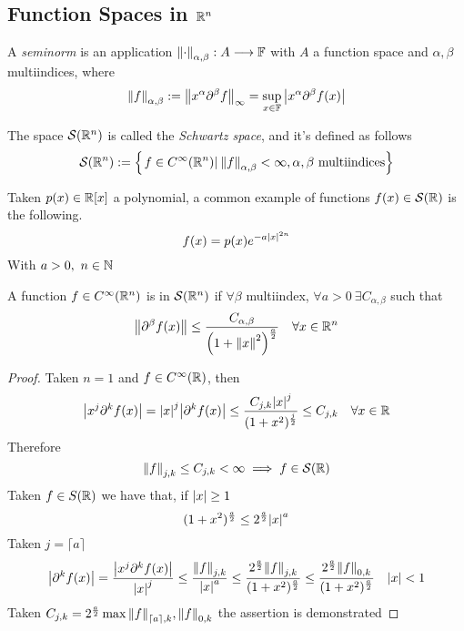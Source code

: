 \documentclass[../complete.tex]{subfiles}
\begin{document}
\subsection{Function Spaces in $\mathbb{R}^n$}
\begin{dfn}[Seminorm]
	A \textit{seminorm} is an application $\norm{\cdot}_{\alpha,\beta}:A\overset{}{\longrightarrow}\mathbb{F}$ with $A$ a function space and $\alpha,\beta$ multiindices, where
	\begin{equation}
		\norm{f}_{\alpha,\beta}:=\norm{x^\alpha\partial^\beta f}_\infty=\sup_{x\in\mathbb{F}}\abs{x^\alpha\partial^\beta f(x)}
		\label{eq:seminorm}
	\end{equation}
\end{dfn}
\begin{dfn}
	The space $\mathcal{S}(\mathbb{R}^n)$ is called the \textit{Schwartz space}, and it's defined as follows
	\begin{equation}
		\mathcal{S}(\mathbb{R}^n):=\left\{ \left.f\in C^\infty(\mathbb{R}^n)\right|_{}\norm{f}_{\alpha,\beta}<\infty, \alpha,\beta\text{ multiindices} \right\}
		\label{eq:schwartzspace}
	\end{equation}
\end{dfn}
\begin{eg}
	Taken $p(x)\in\mathbb{R}[x]$ a polynomial, a common example of functions $f(x)\in\mathcal{S}(\mathbb{R})$ is the following.
	\begin{equation}
		f(x)=p(x)e^{-a\abs{x}^{2n}}
		\label{eq:schwartzfunc}
	\end{equation}
	With $a>0,\ n\in\mathbb{N}$
\end{eg}
\begin{thm}
	A function $f\in C^\infty(\mathbb{R}^n)$ is in $\mathcal{S}(\mathbb{R}^n)$ if $\forall\beta$ multiindex, $\forall a>0\ \exists C_{\alpha,\beta}$ such that
	\begin{equation}
		\norm{\partial^\beta f(x)}\le\frac{C_{\alpha,\beta}}{\left( 1+\norm{x}^2 \right)^{\frac{a}{2}}}\quad\forall x\in\mathbb{R}^n
		\label{eq:schwartzfunc2}
	\end{equation}
\end{thm}
\begin{proof}
	Taken $n=1$ and $f\in C^\infty(\mathbb{R})$, then
	\begin{equation*}
		\abs{x^j\partial^kf(x)}=\abs{x}^j\abs{\partial^kf(x)}\le\frac{C_{j,k}\abs{x}^j}{(1+x^2)^{\frac{j}{2}}}\le C_{j,k}\quad\forall x\in\mathbb{R}
	\end{equation*}
	Therefore
	\begin{equation*}
		\norm{f}_{j,k}\le C_{j,k}<\infty\implies f\in\mathcal{S}(\mathbb{R})
	\end{equation*}
	Taken $f\in{S}(\mathbb{R})$ we have that, if $\abs{x}\ge1$
	\begin{equation*}
		(1+x^2)^{\frac{a}{2}}\le 2^{\frac{a}{2}}\abs{x}^a
	\end{equation*}
	Taken $j=\lceil a\rceil$
	\begin{equation*}
		\abs{\partial^kf(x)}=\frac{\abs{x^j\partial^kf(x)}}{\abs{x}^j}\le\frac{\norm{f}_{j,k}}{\abs{x}^a}\le\frac{2^{\frac{a}{2}}\norm{f}_{j,k}}{(1+x^2)^{\frac{a}{2}}}\le\frac{2^{\frac{a}{2}}\norm{f}_{0,k}}{(1+x^2)^{\frac{a}{2}}}\quad\abs{x}<1
	\end{equation*}
	Taken $C_{j,k}=2^{\frac{a}{2}}\max{\norm{f}_{\lceil a\rceil,k},\norm{f}_{0,k}}$ the assertion is demonstrated
\end{proof}
\end{document}
